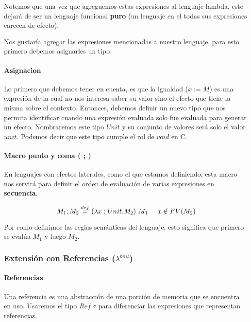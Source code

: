 Notemos que una vez que agreguemos estas expresiones al lenguaje lambda, este dejará de ser un lenguaje funcional \textbf{puro} (un lenguaje en el todas sus expresiones carecen de efecto).

Nos gustaría agregar las expresiones mencionadas a nuestro lenguaje, para esto primero debemos asignarles un tipo. 

\paragraph{Asignacion} Lo primero que debemos tener en cuenta, es que la igualdad ($x := M$) es una expresión de la cual no nos interesa saber su valor sino el efecto que tiene la misma sobre el contexto. Entonces, debemos definir un nuevo tipo que nos permita identificar cuando una expresión evaluada solo fue evaluada para generar un efecto. Nombraremos este tipo $Unit$ y su conjunto de valores será solo el valor $unit$. Podemos decir que este tipo cumple el rol de $void$ en C.

\paragraph{Macro punto y coma ( ; )} En lenguajes con efectos laterales, como el que estamos definiendo, esta macro nos servirá para definir el orden de evaluación de varias expresiones en \textbf{secuencia}.

$$M_1;M_2 \overset{def}{=} (\lambda x: Unit . M_2)~M_1 \hspace*{5mm} x\notin FV(M_2)$$

Por como definimos las reglas semánticas del lenguaje, esto significa que primero se evalúa $M_1$ y luego $M_2$. 

\subsubsection{Extensión con Referencias (\texorpdfstring{$\lambda^{bnu}$}{lambda bnu})}



\paragraph{Referencias}
Una referencia es una abstracción de una porción de memoria que se encuentra en uso. Usaremos el tipo $Ref~\sigma$ para diferenciar las expresiones que representan referencias. 

